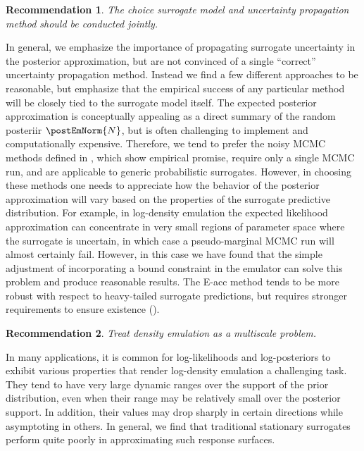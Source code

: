 \documentclass[12pt]{article}
\newtheorem{rec}{Recommendation}
\begin{document}
\begin{rec} \label{rec:prop-uncertainty}
The choice surrogate model and uncertainty propagation method should be conducted jointly.
\end{rec}

In general, we emphasize the importance of propagating surrogate uncertainty in 
the posterior approximation, but are not convinced of a single ``correct'' uncertainty 
propagation method. Instead we find a few different approaches to be reasonable, but
emphasize that the empirical success of any particular method will be closely tied to the
surrogate model itself. The expected posterior approximation is conceptually appealing
as a direct summary of the random posteriir $\postEmNorm{\Ndesign}$, but is often 
challenging to implement and computationally expensive. 
Therefore, we tend to prefer the noisy MCMC methods defined in ,
which show empirical promise, require only a single MCMC run, and are applicable to 
generic probabilistic surrogates.
However, in choosing these methods one needs to appreciate how the behavior of the posterior
approximation will vary based on the properties of the surrogate predictive distribution.
For example, in log-density emulation the expected likelihood approximation can concentrate in very 
small regions of parameter space where the surrogate is uncertain, in which case a pseudo-marginal 
MCMC run will almost certainly fail. However, in this case we have found that the simple adjustment 
of incorporating a bound constraint in the emulator can solve this problem and produce reasonable 
results. The E-acc method tends to be more robust with respect to 
heavy-tailed surrogate predictions, but requires stronger requirements to ensure 
existence (). 

\begin{rec} \label{rec:multiscale}
Treat density emulation as a multiscale problem.
\end{rec}

In many applications, it is common for log-likelihoods and log-posteriors to exhibit various
properties that render log-density emulation a challenging task. They tend to have very 
large dynamic ranges over the support of the prior distribution, even when their range 
may be relatively small over the posterior support. In addition, their values may drop sharply 
in certain directions while asymptoting in others. In general, we find that traditional stationary 
surrogates perform quite poorly in approximating such response surfaces. 
\end{document}
